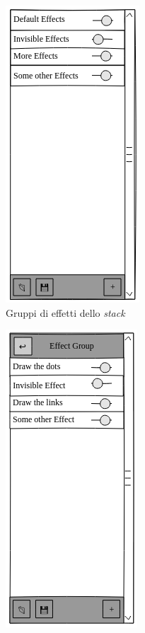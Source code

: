\documentclass[%
]{beamer}
\newcommand{\engEmph}[1] {\emph{\foreignlanguage{english}#1}}
\begin{document}
            \begin{frame}
                \frametitle{\insertsection}
                \framesubtitle{\insertsubsection}

                \begin{figure}[htbp]
                    \captionsetup[subfigure]{labelformat=empty}
                    \centering%
                    \begin{subfigure}{.2\textwidth}
                        \includegraphics[scale=0.4]{mock/crop/groups}
                        \caption{Gruppi di effetti dello \engEmph{stack}}
                        \label{fig:mock:groups}
                    \end{subfigure}
                    \qquad{\LARGE$\Rightarrow$}\qquad
                    \pause
                    \begin{subfigure}{.2\textwidth}
                        \includegraphics[scale=0.4]{mock/crop/effects}

\end{subfigure}
\end{figure}
\end{frame}
\end{document}
